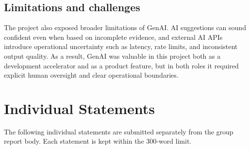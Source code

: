 \documentclass[11pt,a4paper]{article}
\begin{document}
\subsection{Limitations and challenges}

The project also exposed broader limitations of GenAI. AI suggestions can sound confident even when based on incomplete evidence, and external AI APIs introduce operational uncertainty such as latency, rate limits, and inconsistent output quality. As a result, GenAI was valuable in this project both as a development accelerator and as a product feature, but in both roles it required explicit human oversight and clear operational boundaries.

\clearpage
\section*{Individual Statements}

The following individual statements are submitted separately from the group report body. Each statement is kept within the 300-word limit.
\end{document}
